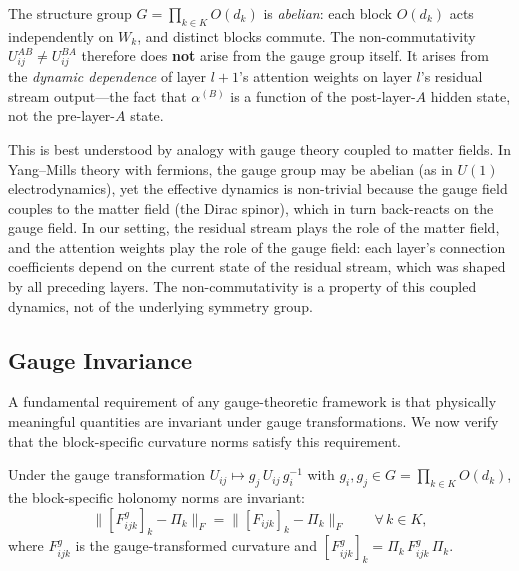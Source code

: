 \begin{remark}
\label{rem:non-abelian-source}
The structure group $G = \prod_{k \in K} O(d_k)$ is \emph{abelian}: each block $O(d_k)$
acts independently on $W_k$, and distinct blocks commute. The non-commutativity
$U_{ij}^{AB} \neq U_{ij}^{BA}$ therefore does \textbf{not} arise from the gauge group
itself. It arises from the \emph{dynamic dependence} of layer $l+1$'s attention weights on
layer $l$'s residual stream output---the fact that $\alpha^{(B)}$ is a function of the
post-layer-$A$ hidden state, not the pre-layer-$A$ state.

This is best understood by analogy with gauge theory coupled to matter fields. In
Yang--Mills theory with fermions, the gauge group may be abelian (as in $U(1)$
electrodynamics), yet the effective dynamics is non-trivial because the gauge field
couples to the matter field (the Dirac spinor), which in turn back-reacts on the gauge
field. In our setting, the residual stream plays the role of the matter field, and the
attention weights play the role of the gauge field: each layer's connection coefficients
depend on the current state of the residual stream, which was shaped by all preceding
layers. The non-commutativity is a property of this coupled dynamics, not of the
underlying symmetry group.
\end{remark}

\subsection{Gauge Invariance}
\label{sec:gauge}

A fundamental requirement of any gauge-theoretic framework is that physically meaningful
quantities are invariant under gauge transformations. We now verify that the block-specific
curvature norms satisfy this requirement.

\begin{proposition}
\label{prop:gauge-invariance}
Under the gauge transformation $U_{ij} \mapsto g_j\, U_{ij}\, g_i^{-1}$ with $g_i, g_j
\in G = \prod_{k \in K} O(d_k)$, the block-specific holonomy norms are invariant:
\[
    \big\|[F^g_{ijk}]_k - \Pi_k\big\|_F = \big\|[F_{ijk}]_k - \Pi_k\big\|_F
    \qquad \forall\, k \in K,
\]
where $F^g_{ijk}$ is the gauge-transformed curvature and $[F^g_{ijk}]_k = \Pi_k\,
F^g_{ijk}\, \Pi_k$.
\end{proposition}

